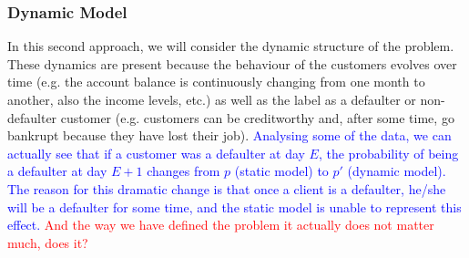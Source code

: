 \subsubsection*{Dynamic Model} 

In this second approach, we will consider the dynamic structure of the problem. These dynamics are present because the behaviour of the customers evolves over time (e.g. the account balance is continuously changing from one month to another, also the income levels, etc.)  as well as the label as a defaulter or non-defaulter customer (e.g. customers can be creditworthy and, after some time, go bankrupt because they have lost their job). \textcolor{blue}{Analysing some of the data, we can actually see that if a customer was a defaulter at day $E$, the probability of being a defaulter at day $E+1$ changes from $p$ (static model) to $p'$ (dynamic model). The reason for this dramatic change is that once a client is a defaulter, he/she will be a defaulter for some time, and the static model is unable to represent this effect.} \textcolor{red}{ And the way we have defined the problem it actually does not matter much, does it?} 




%  
%  
%  
%  
%  

